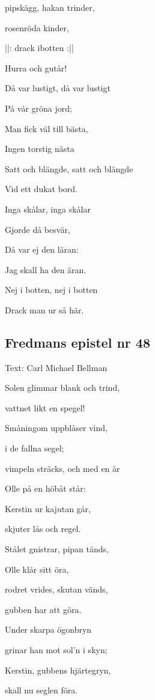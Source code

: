 pipskägg, hakan trinder,

rosenröda kinder,

||: drack ibotten :||

Hurra och gutår!\bigskip



Då var lustigt, då var lustigt

På vår gröna jord;

Man fick väl till bästa,

Ingen torstig nästa

Satt och blängde, satt och blängde

Vid ett dukat bord.\bigskip



Inga skålar, inga skålar

Gjorde då besvär,

Då var ej den läran:

Jag skall ha den äran.

Nej i botten, nej i botten

Drack man ur så här. 

\subsection{\textbf{Fredmans epistel nr 48}}

Text: Carl Michael Bellman\bigskip


Solen glimmar blank och trind,

vattnet likt en spegel!

Småningom uppblåser vind,

i de fallna segel;

vimpeln sträcks, och med en år

Olle på en höbåt står:

Kerstin ur kajutan går,

skjuter lås och regel.\bigskip



Stålet gnistrar, pipan tänds,

Olle klår sitt öra,

rodret vrides, skutan vänds,

gubben har att göra.

Under skarpa ögonbryn

grinar han mot sol’n i skyn;

Kerstin, gubbens hjärtegryn,

skall nu seglen föra.\bigskip



